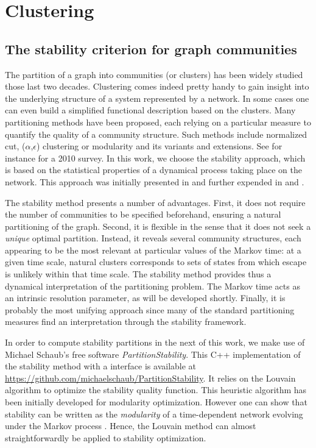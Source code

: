 \chapter{Clustering} \label{chap:clustering}
\section{The stability criterion for graph communities} \label{sec:stability}
The partition of a graph into communities (or clusters) has been widely studied those last two decades. Clustering comes indeed pretty handy to gain insight into the underlying structure of a system represented by a network. In some cases one can even build a simplified functional description based on the clusters. Many partitioning methods have been proposed, each relying on a particular measure to quantify the quality of a community structure. Such methods include normalized cut, ($\alpha$,$\epsilon$) clustering or modularity and its variants and extensions. See for instance \cite{fortunato2010community} for a 2010 survey. In this work, we choose the stability approach, which is based on the statistical properties of a dynamical process taking place on the network. This approach was initially presented in \cite{delvenne2010stability} and further expended in \cite{lambiotte2009laplacian} and \cite{delvenne2013stability}. 

The stability method presents a number of advantages. First, it does not require the number of communities to be specified beforehand, ensuring a natural partitioning of the graph. Second, it is flexible in the sense that it does not seek a \textit{unique} optimal partition. Instead, it reveals several community structures, each appearing to be the most relevant at particular values of the Markov time: at a given time scale, natural clusters corresponds to sets of states from which escape is unlikely within that time scale. The stability method provides thus a dynamical interpretation of the partitioning problem. The Markov time acts as an intrinsic resolution parameter, as will be developed shortly. Finally, it is probably the most unifying approach since many of the standard partitioning measures find an interpretation through the stability framework.

In order to compute stability partitions in the next of this work, we make use of Michael Schaub's free software \textit{PartitionStability}. This C++ implementation of the stability method with a \matlab interface is available at \url{https://github.com/michaelschaub/PartitionStability}. It relies on the Louvain algorithm \cite{blondel2008fast} to optimize the stability quality function. This heuristic algorithm has been initially developed for modularity optimization. However one can show that stability can be written as the \textit{modularity} of a time-dependent network evolving under the Markov process \cite{lambiotte2009laplacian}. Hence, the Louvain method can almost straightforwardly be applied to stability optimization.

